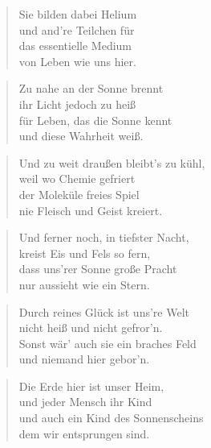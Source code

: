 \documentclass[10pt,a4paper]{article}
\begin{document}
\begin{paracol}{2}
\begin{verse}
Sie bilden dabei Helium \\
und and’re Teilchen für \\
das essentielle Medium \\
von Leben wie uns hier. \\
\end{verse}

\begin{verse}
Zu nahe an der Sonne brennt \\
ihr Licht jedoch zu heiß \\
für Leben, das die Sonne kennt \\
und diese Wahrheit weiß. \\
\end{verse}

\begin{verse}
Und zu weit draußen bleibt’s zu kühl, \\
weil wo Chemie gefriert \\
der Moleküle freies Spiel \\
nie Fleisch und Geist kreiert. \\
\end{verse}

\begin{verse}
Und ferner noch, in tiefster Nacht, \\
kreist Eis und Fels so fern, \\
dass uns’rer Sonne große Pracht \\
nur aussieht wie ein Stern. \\
\end{verse}

\begin{verse}
Durch reines Glück ist uns’re Welt \\
nicht heiß und nicht gefror’n. \\
Sonst wär’ auch sie ein braches Feld \\
und niemand hier gebor’n. \\
\end{verse}

\begin{verse}
Die Erde hier ist unser Heim, \\
und jeder Mensch ihr Kind \\
und auch ein Kind des Sonnenscheins \\
dem wir entsprungen sind. \\
\end{verse}


\end{paracol}
\end{document}
